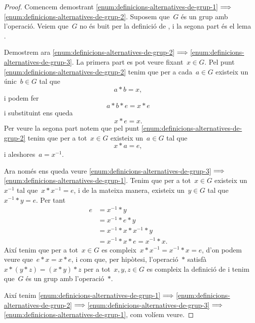 \documentclass[../estructures-algebraiques.tex]{subfiles}
\begin{document}
    \begin{proof}
        Comencem demostrant \eqref{enum:definicions-alternatives-de-grup-1}\(\implies\)\eqref{enum:definicions-alternatives-de-grup-2}.
        Suposem que~\(G\) és un grup amb l'operació.
        Veiem que~\(G\) no és buit per la definició de , i la segona part és el lema .

        Demostrem ara \eqref{enum:definicions-alternatives-de-grup-2}\(\implies\)\eqref{enum:definicions-alternatives-de-grup-3}.
        La primera part es pot veure fixant~\(x\in G\).
        Pel punt \eqref{enum:definicions-alternatives-de-grup-2} tenim que per a cada~\(a\in G\) existeix un únic~\(b\in G\) tal que
        \[
            a\ast b=x,
        \]
        i podem fer
        \[
            a\ast b\ast e=x\ast e
        \]
        i substituint ens queda
        \[
            x\ast e=x.
        \]
        Per veure la segona part notem que pel punt \eqref{enum:definicions-alternatives-de-grup-2} tenim que per a tot~\(x\in G\) existeix un~\(a\in G\) tal que
        \[
            x\ast a=e,
        \]
        i aleshores~\(a=x^{-1}\).

        Ara només ens queda veure \eqref{enum:definicions-alternatives-de-grup-3}\(\implies\)\eqref{enum:definicions-alternatives-de-grup-1}.
        Tenim que per a tot~\(x\in G\) existeix un~\(x^{-1}\) tal que~\(x\ast x^{-1}=e\), i de la mateixa manera, existeix un~\(y\in G\) tal que~\(x^{-1}\ast y=e\).
        Per tant
        \begin{align*}
        e&=x^{-1}\ast y\\
        &=x^{-1}\ast e\ast y\\
        &=x^{-1}\ast x\ast x^{-1}\ast y\\
        &=x^{-1}\ast x\ast e=x^{-1}\ast x.
        \end{align*}
        Així tenim que per a tot~\(x\in G\) es compleix~\(x\ast x^{-1}=x^{-1}\ast x=e\), d'on podem veure que~\(e\ast x=x\ast e\), i com que, per hipòtesi, l'operació~\(\ast\) satisfà~\(x\ast(y\ast z)=(x\ast y)\ast z\) per a tot~\(x,y,z\in G\) es compleix la definició de  i tenim que~\(G\) és un grup amb l'operació~\(\ast\).

        Així tenim \eqref{enum:definicions-alternatives-de-grup-1}\(\implies\)\eqref{enum:definicions-alternatives-de-grup-2}\(\implies\)\eqref{enum:definicions-alternatives-de-grup-3}\(\implies\)\eqref{enum:definicions-alternatives-de-grup-1}, com volíem veure.
    \end{proof}
\end{document}
